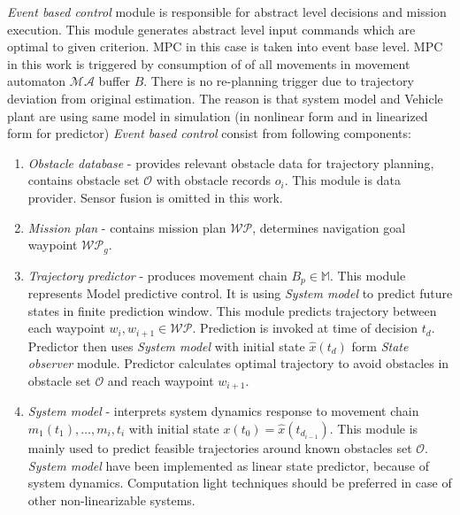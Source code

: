 \noindent \textit{Event based control} module is responsible for abstract level decisions and mission execution. This module generates abstract level input commands which are optimal to given criterion. MPC in this case is taken into event base level. MPC in this work is triggered by consumption of of all movements in movement automaton $\mathscr{MA}$ buffer $B$. There is no re-planning trigger due to trajectory deviation from original estimation. The reason is that system model and Vehicle plant are using same model in simulation (in nonlinear form and in linearized form for predictor)  \textit{Event based control} consist from following components:
\begin{enumerate}
    \item \textit{Obstacle database} - provides relevant obstacle data for trajectory planning, contains obstacle set $\mathscr{O}$ with obstacle records $o_i$. This module is data provider. Sensor fusion is omitted in this work.
    \item \textit{Mission plan} - contains mission plan $\mathscr{WP}$, determines navigation goal waypoint $\mathscr{WP}_g$.
    \item \textit{Trajectory predictor} - produces movement chain $B_p\in \mathbb{M}$. This module represents Model predictive control. It is using \textit{System model} to predict future states in finite prediction window. This module predicts trajectory between each waypoint $w_i,w_{i+1}\in\mathscr{WP}$. Prediction is invoked at time of decision $t_d$. Predictor then uses \textit{System model} with initial state $\hat{x}(t_d)$ form \textit{State observer} module. Predictor calculates optimal trajectory to avoid obstacles in obstacle set $\mathscr{O}$ and reach waypoint $w_{i+1}$.
    \item \textit{System model} - interprets system dynamics response to movement chain $m_1(t_1),\dots,m_i,t_i$ with initial state $x(t_0)=\hat{x}(t_{d_{i-1}})$. This module is mainly used to predict feasible trajectories around known obstacles set $\mathscr{O}$. \textit{System model} have been implemented as linear state predictor, because of system dynamics. Computation light techniques should be preferred in case of other non-linearizable systems. 
\end{enumerate}

